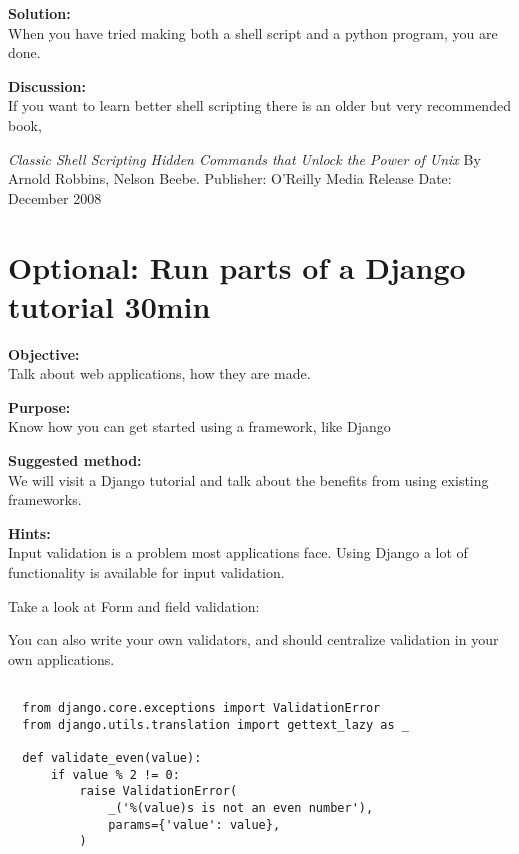 \documentclass[a4paper,11pt,notitlepage]{report}
\begin{document}
{\bf Solution:}\\
When you have tried making both a shell script and a python program, you are done.

{\bf Discussion:}\\
If you want to learn better shell scripting there is an older but very recommended book,

\emph{Classic Shell Scripting
Hidden Commands that Unlock the Power of Unix}
By Arnold Robbins, Nelson Beebe. Publisher: O'Reilly Media
Release Date: December 2008


\chapter{Optional: Run parts of a Django tutorial 30min}
\label{ex:django-intro}

{\bf Objective:}\\
Talk about web applications, how they are made.

{\bf Purpose:}\\
Know how you can get started using a framework, like Django\\ 

{\bf Suggested method:}\\
We will visit a Django tutorial and talk about the benefits from using existing frameworks.

{\bf Hints:}\\
Input validation is a problem most applications face. Using Django a lot of functionality is available for input validation.

Take a look at Form and field validation:\\

You can also write your own validators, and should centralize validation in your own applications.

\begin{verbatim}

  from django.core.exceptions import ValidationError
  from django.utils.translation import gettext_lazy as _

  def validate_even(value):
      if value % 2 != 0:
          raise ValidationError(
              _('%(value)s is not an even number'),
              params={'value': value},
          )
\end{verbatim}
\end{document}
